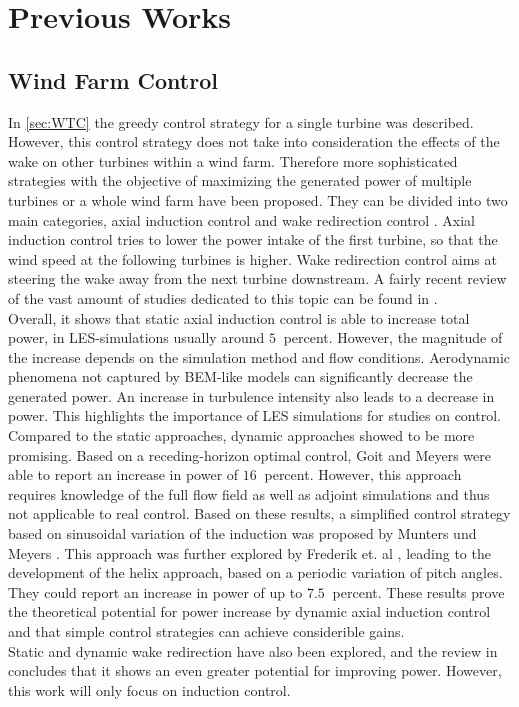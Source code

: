 \section{Previous Works}
\subsection{Wind Farm Control}
In \autoref{sec:WTC} the greedy control strategy for a single turbine was described. However, this control strategy does not take into consideration the effects of the wake on other turbines within a wind farm. Therefore more sophisticated strategies with the objective of maximizing the generated power of multiple turbines or a whole wind farm have been proposed. They can be divided into two main categories, axial induction control and wake redirection control \cite{boersma_tutorial_2017}. 
Axial induction control tries to lower the power intake of the first turbine, so that the wind speed at the following turbines is higher. Wake redirection control aims at steering the wake away from the next turbine downstream. A fairly recent review of the vast amount of studies dedicated to this topic can be found in \cite{kheirabadi_quantitative_2019}. \\
Overall, it shows that static axial induction control is able to increase total power, in LES-simulations usually around $\SI{5}{}$ percent. However, the magnitude of the increase depends on the simulation method and flow conditions. Aerodynamic phenomena not captured by BEM-like models can significantly decrease the generated power. An increase in turbulence intensity also leads to a decrease in power. This highlights the importance of LES simulations for studies on control.
Compared to the static approaches, dynamic approaches showed to be more promising. Based on a receding-horizon optimal control, Goit and Meyers \cite{goit_optimal_2015} were able to report an increase in power of $\SI{16}{}$ percent. However, this approach requires knowledge of the full flow field as well as adjoint simulations and thus not applicable to real control. Based on these results, a simplified control strategy based on sinusoidal variation of the induction was proposed by Munters und Meyers \cite{munters_towards_2018}. This approach was further explored by Frederik et. al \cite{frederik_helix_2020}, leading to the development of the helix approach, based on a periodic variation of pitch angles. They could report an increase in power of up to $\SI{7.5}{}$ percent. These results prove the theoretical potential for power increase by dynamic axial induction control and that simple control strategies can achieve considerible gains. \\
Static and dynamic wake redirection have also been explored, and the review in \cite{kheirabadi_quantitative_2019} concludes that it shows an even greater potential for improving power. However, this work will only focus on induction control.
